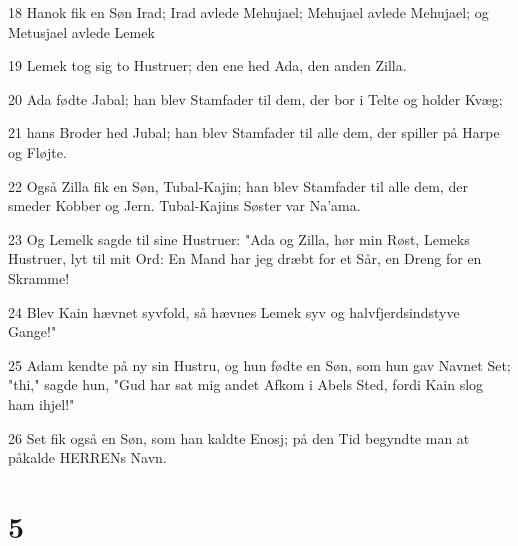 \par 18 Hanok fik en Søn Irad; Irad avlede Mehujael; Mehujael avlede Mehujael; og Metusjael avlede Lemek
\par 19 Lemek tog sig to Hustruer; den ene hed Ada, den anden Zilla.
\par 20 Ada fødte Jabal; han blev Stamfader til dem, der bor i Telte og holder Kvæg;
\par 21 hans Broder hed Jubal; han blev Stamfader til alle dem, der spiller på Harpe og Fløjte.
\par 22 Også Zilla fik en Søn, Tubal-Kajin; han blev Stamfader til alle dem, der smeder Kobber og Jern. Tubal-Kajins Søster var Na'ama.
\par 23 Og Lemelk sagde til sine Hustruer: "Ada og Zilla, hør min Røst, Lemeks Hustruer, lyt til mit Ord: En Mand har jeg dræbt for et Sår, en Dreng for en Skramme!
\par 24 Blev Kain hævnet syvfold, så hævnes Lemek syv og halvfjerdsindstyve Gange!"
\par 25 Adam kendte på ny sin Hustru, og hun fødte en Søn, som hun gav Navnet Set; "thi," sagde hun, "Gud har sat mig andet Afkom i Abels Sted, fordi Kain slog ham ihjel!"
\par 26 Set fik også en Søn, som han kaldte Enosj; på den Tid begyndte man at påkalde HERRENs Navn.

\chapter{5}

